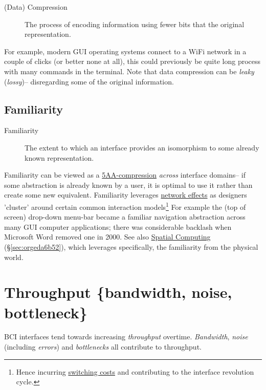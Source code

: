 \documentclass[logo,bsc,singlespacing,parskip]{infthesis}
\begin{document}
\begin{mdframed}
\begin{description}
\item[{(Data) Compression\label{compression}}] The process of encoding information using fewer bits that the original representation.
\end{description}
\end{mdframed}

For example, modern GUI operating systems connect to a WiFi network in a couple of clicks (or better none at all), this could previously be quite long process with many commands in the terminal.
Note that data compression can be \emph{leaky} (\emph{lossy})-- disregarding some of the original information.

\subsection{Familiarity}
\label{sec:orgd4bcef4}
\medskip
\begin{mdframed}
\begin{description}
\item[{Familiarity\label{familiarity}}] The extent to which an interface provides an isomorphism to some already known representation.
\end{description}
\end{mdframed}

Familiarity can be viewed as a \hyperref[compression]{5AA-compression} \emph{across} interface domains-- if some abstraction is already known by a user, it is optimal to use it rather than create some new equivalent.
Familiarity leverages \hyperref[network effects]{network effects} as designers 'cluster' around certain common interaction models\footnote{Hence incurring \hyperref[switching costs]{switching costs} and contributing to the interface revolution cycle.}
For example the (top of screen) drop-down menu-bar became a familiar navigation abstraction across many GUI computer applications; there was considerable backlash when Microsoft Word removed one in 2000.
See also \hyperref[sec:orgeda6b52]{Spatial Computing} (\S \ref{sec:orgeda6b52}), which leverages specifically, the familiarity from the physical world.

\section{Throughput \{bandwidth, noise, bottleneck\}}
\label{sec:orgc29fc9e}
BCI interfaces tend towards increasing \emph{throughput} overtime. \emph{Bandwidth}, \emph{noise} (including \emph{errors}) and \emph{bottlenecks} all contribute to throughput.
\end{document}
